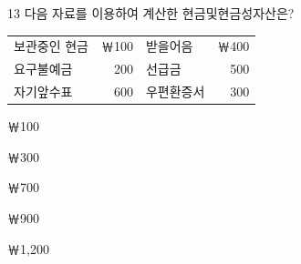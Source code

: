 \begin{question}{13}
다음 자료를 이용하여 계산한 현금및현금성자산은? \begin{center}
\small
\begin{tabular}{|l r l r|}
\hline
보관중인 현금 & ￦100 & 받을어음 & ￦400 \\
요구불예금 & 200 & 선급금 & 500 \\
자기앞수표 & 600 & 우편환증서 & 300 \\
\hline
\end{tabular}
\end{center}
\begin{choices}
  \item ￦100
  \item ￦300
  \item ￦700
  \item ￦900
  \item ￦1,200
\end{choices}
\end{question}
